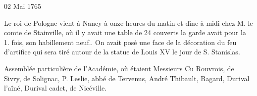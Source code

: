                      \begin{diary}{02 Mai 1765}{}
                        
                        
                           Le roi de Pologne vient à Nancy à
                           onze heures
                           du matin et dîne à midi chez
                           M. le comte
                              de Stainville, où il y avait une table de
                           24 couverts la garde avait pour la 1. fois, son habillement neuf.. On avait posé une face
                           de la décoration du feu d'artifice qui sera
                           tiré autour de la statue de Louis XV le
                           jour de S. Stanislas. \bigskip
        
        
                         Assemblée particulière de l'Académie, où
                           étaient Messieurs
                           Cu Rouvrois, de Sivry, de
                              Solignac, P.
                           Leslie, abbé de Tervenus,
                              André
                           Thibault, Bagard, Durival
                              l'aîné, Durival
                              cadet, de
                              Nicéville. \bigskip
        
        
                        

\end{diary}
